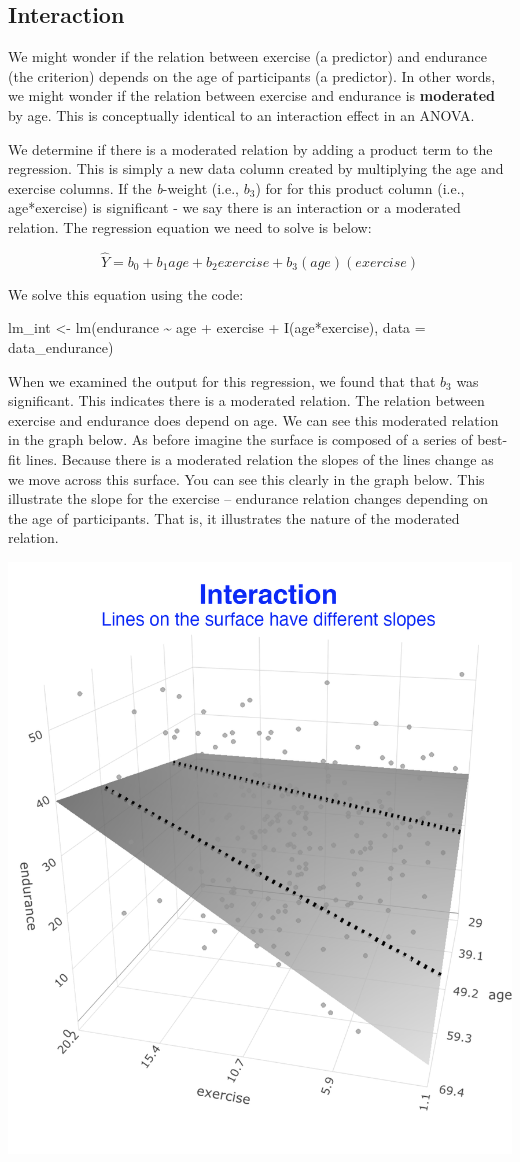 \documentclass[
]{krantz}
\makeatletter
\newenvironment{Shaded}{\begin{snugshade}}{\end{snugshade}}
\newcommand{\AttributeTok}[1]{\textcolor[rgb]{0.61,0.61,0.61}{#1}}
\newcommand{\FunctionTok}[1]{\textcolor[rgb]{0,0,0}{#1}}
\newcommand{\NormalTok}[1]{#1}
\newcommand{\OtherTok}[1]{\textcolor[rgb]{0.37,0.37,0.37}{#1}}
\newcommand{\SpecialCharTok}[1]{\textcolor[rgb]{0,0,0}{#1}}
\newenvironment{kframe}{%
\medskip{}
\setlength{\fboxsep}{.8em}
 \def\at@end@of@kframe{}%
 \ifinner\ifhmode%
  \def\at@end@of@kframe{\end{minipage}}%
  \begin{minipage}{\columnwidth}%
 \fi\fi%
 \def\FrameCommand##1{\hskip\@totalleftmargin \hskip-\fboxsep
 \colorbox{shadecolor}{##1}\hskip-\fboxsep
     \hskip-\linewidth \hskip-\@totalleftmargin \hskip\columnwidth}%
 \MakeFramed {\advance\hsize-\width
   \@totalleftmargin\z@ \linewidth\hsize
   \@setminipage}}%
 {\par\unskip\endMakeFramed%
 \at@end@of@kframe}
\renewenvironment{Shaded}{\begin{kframe}}{\end{kframe}}
\makeatother
\begin{document}
\hypertarget{interaction}{%
\subsection{Interaction}\label{interaction}}

We might wonder if the relation between exercise (a predictor) and endurance (the criterion) depends on the age of participants (a predictor). In other words, we might wonder if the relation between exercise and endurance is \textbf{moderated} by age. This is conceptually identical to an interaction effect in an ANOVA.

We determine if there is a moderated relation by adding a product term to the regression. This is simply a new data column created by multiplying the age and exercise columns. If the \emph{b}-weight (i.e., \(b_3\)) for for this product column (i.e., age*exercise) is significant - we say there is an interaction or a moderated relation. The regression equation we need to solve is below:

\[ \hat{Y} = b_0 + b_1age + b_2exercise + b_3(age)(exercise)\]

We solve this equation using the code:

\begin{Shaded}
\begin{Highlighting}[]
\NormalTok{lm\_int }\OtherTok{\textless{}{-}} \FunctionTok{lm}\NormalTok{(endurance }\SpecialCharTok{\textasciitilde{}}\NormalTok{ age }\SpecialCharTok{+}\NormalTok{ exercise }\SpecialCharTok{+} \FunctionTok{I}\NormalTok{(age}\SpecialCharTok{*}\NormalTok{exercise),}
             \AttributeTok{data =}\NormalTok{ data\_endurance)}
\end{Highlighting}
\end{Shaded}

When we examined the output for this regression, we found that that \(b_3\) was significant. This indicates there is a moderated relation. The relation between exercise and endurance does depend on age. We can see this moderated relation in the graph below. As before imagine the surface is composed of a series of best-fit lines. Because there is a moderated relation the slopes of the lines change as we move across this surface. You can see this clearly in the graph below. This illustrate the slope for the exercise -- endurance relation changes depending on the age of participants. That is, it illustrates the nature of the moderated relation.

\includegraphics[width=0.35\linewidth]{ch_mmr/images/mmr_int}
\end{document}
